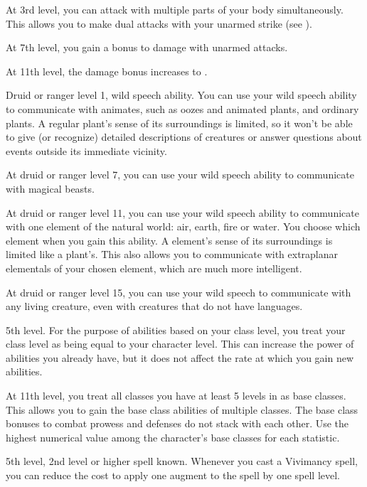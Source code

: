     At 3rd level, you can attack with multiple parts of your body simultaneously.
    This allows you to make dual attacks with your unarmed strike (see ).

    At 7th level, you gain a  bonus to damage with unarmed attacks.

    At 11th level, the damage bonus increases to .

    \featpres Druid or ranger level 1, wild speech ability.
    \featben You can use your wild speech ability to communicate with animates, such as oozes and animated plants, and ordinary plants. A regular plant's sense of its surroundings is limited, so it won't be able to give (or recognize) detailed descriptions of creatures or answer questions about events outside its immediate vicinity.

    At druid or ranger level 7, you can use your wild speech ability to communicate with magical beasts.

    At druid or ranger level 11, you can use your wild speech ability to communicate with one element of the natural world: air, earth, fire or water.
    You choose which element when you gain this ability.
    A element's sense of its surroundings is limited like a plant's.
    This also allows you to communicate with extraplanar elementals of your chosen element, which are much more intelligent.

    At druid or ranger level 15, you can use your wild speech to communicate with any living creature, even with creatures that do not have languages.

    \featpre 5th level.
    \featben For the purpose of abilities based on your class level, you treat your class level as being equal to your character level.
    This can increase the power of abilities you already have, but it does not affect the rate at which you gain new abilities.

    At 11th level, you treat all classes you have at least 5 levels in as base classes.
    This allows you to gain the base class abilities of multiple classes.
    The base class bonuses to combat prowess and defenses do not stack with each other.
    Use the highest numerical value among the character's base classes for each statistic.

    \featpres 5th level, 2nd level or higher  spell known.
    \featben Whenever you cast a Vivimancy spell, you can reduce the cost to apply one augment to the spell by one spell level.

